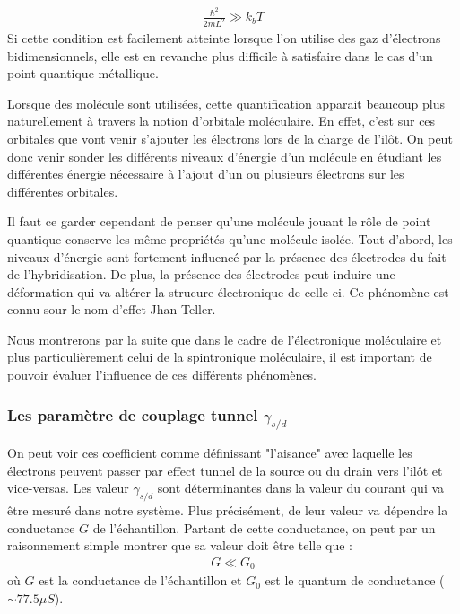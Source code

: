 \begin{eqnarray}
\frac{\hbar^2}{2mL^2} \gg k_bT \nonumber
\end{eqnarray}
Si cette condition est facilement atteinte lorsque l'on utilise des gaz d'électrons bidimensionnels, elle est en revanche plus difficile à satisfaire dans le cas d'un point quantique métallique. \newline


Lorsque des molécule sont utilisées, cette quantification apparait beaucoup plus naturellement à travers la notion d'orbitale moléculaire. En effet, c'est sur ces orbitales que vont venir s'ajouter les électrons lors de la charge de l'il\^ot. On peut donc venir sonder les différents niveaux d'énergie d'un molécule en étudiant les différentes énergie nécessaire à l'ajout d'un ou plusieurs électrons sur les différentes orbitales. 

Il faut ce garder cependant de penser qu'une molécule jouant le r\^ole de point quantique conserve les m\^eme propriétés qu'une molécule isolée. Tout d'abord, les niveaux d'énergie sont fortement influencé par la présence des électrodes du fait de l'hybridisation. De plus, la présence des électrodes peut induire une déformation qui va altérer la strucure électronique de celle-ci. Ce phénomène est connu sour le nom d'effet Jhan-Teller. 

Nous montrerons par la suite que dans le cadre de l'électronique moléculaire et plus particulièrement celui de la spintronique moléculaire, il est important de pouvoir évaluer l'influence de ces différents phénomènes.

\subsubsection{Les paramètre de couplage tunnel $\gamma_{s/d}$}
On peut voir ces coefficient comme définissant "l'aisance" avec laquelle les électrons peuvent passer par effect tunnel de la source ou du drain vers l'il\^ot et vice-versas. Les valeur $\gamma_{s/d}$ sont déterminantes dans la valeur du courant qui va \^etre mesuré dans notre système. Plus précisément, de leur valeur va dépendre la conductance $G$ de l'échantillon. Partant de cette conductance, on peut par un raisonnement simple montrer que sa valeur doit \^etre telle que :
\begin{eqnarray}
G \ll G_0
\end{eqnarray}
où $G$ est la conductance de l'échantillon et $G_0$ est le quantum de conductance ($\sim 77.5 \mu S$).


